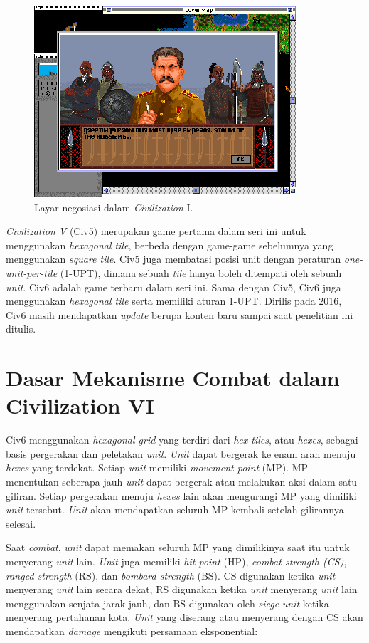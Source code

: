 \begin{figure}[H]
  \centering
    \includegraphics[scale=1.1]{gambar/Civ_1_negotiation.png}
    \caption{Layar negosiasi dalam \emph{Civilization} I.}
    \label{fig:civ1Negotiation}
\end{figure}

\emph{Civilization V} (Civ5) merupakan game pertama dalam seri ini untuk menggunakan \emph{hexagonal tile},
berbeda dengan game-game sebelumnya yang menggunakan \emph{square tile}. Civ5 juga membatasi posisi unit dengan peraturan \emph{one-unit-per-tile}
(1-UPT), dimana sebuah \emph{tile} hanya boleh ditempati oleh sebuah \emph{unit}.
Civ6 adalah game terbaru dalam seri ini. Sama dengan Civ5, Civ6 juga menggunakan \emph{hexagonal tile} serta memiliki aturan 1-UPT.
Dirilis pada 2016, Civ6 masih mendapatkan \emph{update} berupa konten baru sampai saat penelitian ini ditulis.

\section{Dasar Mekanisme Combat dalam Civilization VI}
Civ6 menggunakan \emph{hexagonal grid} yang terdiri dari \emph{hex tiles}, atau \emph{hexes}, sebagai basis pergerakan dan peletakan \emph{unit}. 
\emph{Unit} dapat bergerak ke enam arah menuju \emph{hexes} yang terdekat. Setiap \emph{unit} memiliki \emph{movement point} (MP). 
MP menentukan seberapa jauh \emph{unit} dapat bergerak atau melakukan aksi dalam satu giliran. 
Setiap pergerakan menuju \emph{hexes} lain akan mengurangi MP yang dimiliki \emph{unit} tersebut.
\emph{Unit} akan mendapatkan seluruh MP kembali setelah gilirannya selesai.

Saat \emph{combat}, \emph{unit} dapat memakan seluruh MP yang dimilikinya saat itu untuk menyerang \emph{unit} lain.
\emph{Unit} juga memiliki \emph{hit point} (HP), \emph{combat strength (CS)}, \emph{ranged strength} (RS), dan \emph{bombard strength} (BS).
CS digunakan ketika \emph{unit} menyerang \emph{unit} lain secara dekat, RS digunakan ketika \emph{unit} menyerang \emph{unit} lain menggunakan senjata jarak jauh, dan BS digunakan oleh \emph{siege} \emph{unit} ketika menyerang pertahanan kota.
\emph{Unit} yang diserang atau menyerang dengan CS akan mendapatkan \emph{damage} mengikuti persamaan eksponential\citep{civ6Combat}:

